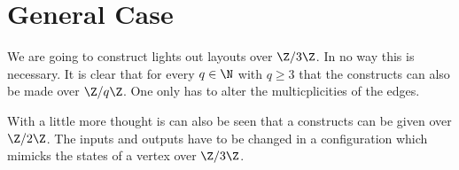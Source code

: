 \section{General Case}\label{section:general}

We are going to construct lights out layouts over $\Z/3\Z$. In no way
this is necessary. It is clear that for every $q\in\N$ with $q\ge 3$
that the constructs can also be made over $\Z/q\Z$. One only has to
alter the multicplicities of the edges.

With a little more thought is can also be seen that a constructs can be
given over $\Z/2\Z$. The inputs and outputs have to be changed in a
configuration which mimicks the states of a vertex over $\Z/3\Z$. 

